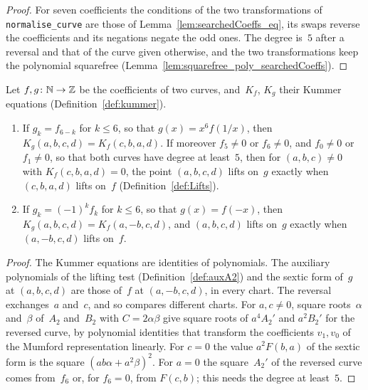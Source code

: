 \begin{proof}
  \leanok
  For seven coefficients the conditions of the two transformations of \texttt{normalise\_curve}
  are those of Lemma~\ref{lem:searchedCoeffs_eq}, its swaps reverse the coefficients and its
  negations negate the odd ones. The degree is~$5$ after a reversal and that of the curve given
  otherwise, and the two transformations keep the polynomial squarefree
  (Lemma~\ref{lem:squarefree_poly_searchedCoeffs}).
\end{proof}

\begin{lemma}\label{lem:lifts_iff_of_reversed}
  \leanok
  Let $f, g \colon \mathbb{N} \to \mathbb{Z}$ be the coefficients of two curves, and~$K_f$, $K_g$ their Kummer
  equations (Definition~\ref{def:kummer}).
  \begin{enumerate}
    \item If $g_k = f_{6-k}$ for $k \le 6$, so that $g(x) = x^6 f(1/x)$, then $K_g(a, b, c, d) =
      K_f(c, b, a, d)$. If moreover $f_5 \ne 0$ or $f_6 \ne 0$, and $f_0 \ne 0$ or $f_1 \ne 0$, so
      that both curves have degree at least~$5$, then for $(a, b, c) \ne 0$ with $K_f(c, b, a, d)
      = 0$, the point $(a, b, c, d)$ lifts on~$g$ exactly when $(c, b, a, d)$ lifts on~$f$
      (Definition~\ref{def:Lifts}).
    \item If $g_k = (-1)^k f_k$ for $k \le 6$, so that $g(x) = f(-x)$, then $K_g(a, b, c, d) =
      K_f(a, -b, c, d)$, and $(a, b, c, d)$ lifts on~$g$ exactly when $(a, -b, c, d)$ lifts
      on~$f$.
  \end{enumerate}
\end{lemma}

\begin{proof}
  \leanok
  The Kummer equations are identities of polynomials. The auxiliary polynomials of the lifting test
  (Definition~\ref{def:auxA2}) and the sextic form of~$g$ at $(a, b, c, d)$ are those of~$f$ at
  $(a, -b, c, d)$, in every chart. The reversal exchanges~$a$ and~$c$, and so compares different
  charts. For $a, c \ne 0$, square roots~$\alpha$ and~$\beta$ of~$A_2$ and~$B_2$ with $C =
  2\alpha\beta$ give square roots of $a^4 A_2'$ and $a^2 B_2'$ for the reversed curve, by
  polynomial identities that transform the coefficients $v_1, v_0$ of the Mumford representation
  linearly. For $c = 0$ the value $a^2 F(b, a)$ of the sextic form is the square $(ab\alpha +
  a^2\beta)^2$. For $a = 0$ the square~$A_2'$ of the reversed curve comes from~$f_6$ or, for $f_6 =
  0$, from $F(c, b)$; this needs the degree at least~$5$.
\end{proof}


